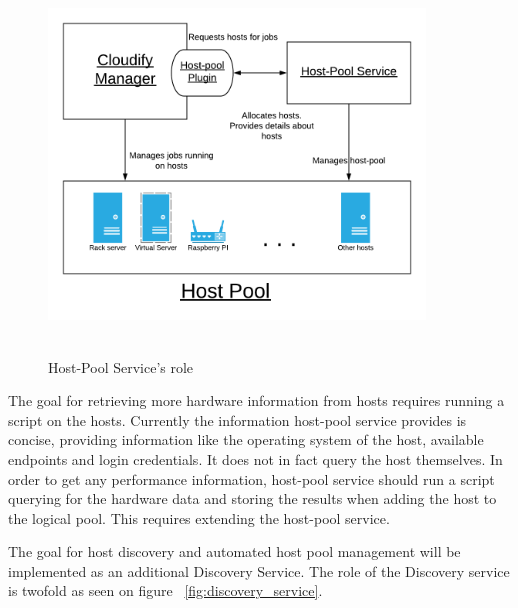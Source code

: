  \begin{figure}[ht!]
\centering
  \includegraphics[width=10cm,height=10cm, keepaspectratio]{Cloudify_roles.png}%
  \caption{Host-Pool Service's role}
  \label{fig:cloudify_roles}
\end{figure}

The goal for retrieving more hardware information from hosts requires running a script on the hosts. Currently the information host-pool service provides is concise, providing information like the operating system of the host, available endpoints and login credentials. It does not in fact query the host themselves. In order to get any performance information, host-pool service should run a script querying for the hardware data and storing the results when adding the host to the logical pool. This requires extending  the host-pool service.

The goal for host discovery and automated host pool management will be implemented as an additional Discovery Service.
The role of the Discovery service is twofold as seen on figure ~\ref{fig:discovery_service}.



